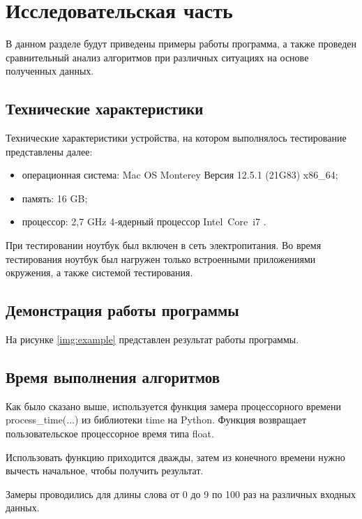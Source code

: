 \chapter{Исследовательская часть}

В данном разделе будут приведены примеры работы программа, а также проведен сравнительный анализ алгоритмов при различных ситуациях на основе полученных данных.

\section{Технические характеристики}

Технические характеристики устройства, на котором выполнялось тестирование представлены далее:

\begin{itemize}
    \item операционная система: Mac OS Monterey Версия 12.5.1 (21G83) \cite{macos} x86\_64;
    \item память: 16 GB;
    \item процессор: 2,7 GHz 4‑ядерный процессор Intel Core i7 \cite{intel}.
\end{itemize}

При тестировании ноутбук был включен в сеть электропитания. Во время тестирования ноутбук был нагружен только встроенными приложениями окружения, а также системой тестирования.

\section{Демонстрация работы программы}

На рисунке \ref{img:example} представлен результат работы программы.

\clearpage

\section{Время выполнения алгоритмов}

Как было сказано выше, используется функция замера процессорного времени process\_time(...) из библиотеки time на Python. Функция возвращает пользовательское процессорное время типа float.

Использовать функцию приходится дважды, затем из конечного времени нужно вычесть начальное, чтобы получить результат.

Замеры проводились для длины слова от 0 до 9 по 100 раз на различных входных данных.

